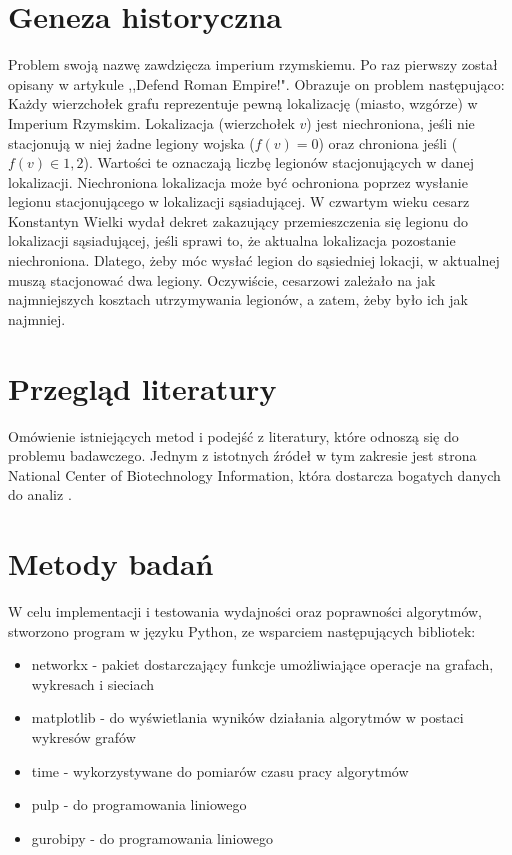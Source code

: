\section{Geneza historyczna}
Problem swoją nazwę zawdzięcza imperium rzymskiemu. Po raz pierwszy został opisany w artykule ,,Defend Roman Empire!".
Obrazuje on problem następująco: Każdy wierzchołek grafu reprezentuje pewną lokalizację (miasto, wzgórze) w Imperium Rzymskim. Lokalizacja (wierzchołek $v$) jest niechroniona, jeśli nie stacjonują w niej żadne legiony wojska ($f(v) = 0$) oraz chroniona jeśli ($f(v) \in {1,2} $). Wartości te oznaczają liczbę legionów stacjonujących w danej lokalizacji. Niechroniona lokalizacja może być ochroniona poprzez wysłanie legionu stacjonującego w lokalizacji sąsiadującej. W czwartym wieku cesarz Konstantyn Wielki wydał dekret zakazujący przemieszczenia się legionu do lokalizacji sąsiadującej, jeśli sprawi to, że aktualna lokalizacja pozostanie niechroniona. Dlatego, żeby móc wysłać legion do sąsiedniej lokacji, w aktualnej muszą stacjonować dwa legiony. Oczywiście, cesarzowi zależało na jak najmniejszych kosztach utrzymywania legionów, a zatem, żeby było ich jak najmniej. \cite{theoryWCRDF}

\section{Przegląd literatury}
Omówienie istniejących metod i podejść z literatury, które odnoszą się do problemu badawczego. Jednym z istotnych źródeł w tym zakresie jest strona National Center of Biotechnology Information, która dostarcza bogatych danych do analiz \cite{openai2024}.

\section{Metody badań}
W celu implementacji i testowania wydajności oraz poprawności algorytmów, stworzono program w języku Python, ze wsparciem następujących bibliotek:
\begin{itemize}
    \item networkx - pakiet dostarczający funkcje umożliwiające operacje na grafach, wykresach i sieciach
    \item matplotlib - do wyświetlania wyników działania algorytmów w postaci wykresów grafów
    \item time - wykorzystywane do pomiarów czasu pracy algorytmów
    \item pulp - do programowania liniowego
    \item gurobipy - do programowania liniowego
\end{itemize}

